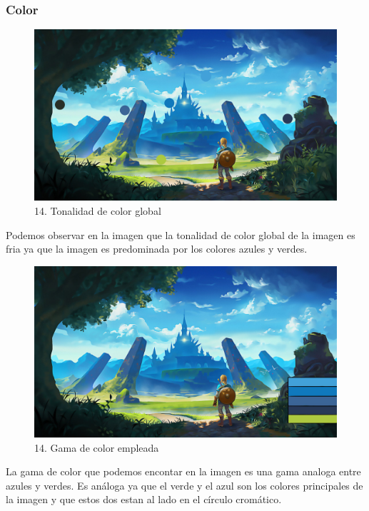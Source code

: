 \documentclass[12pt]{article}
\begin{document}
    \subsubsection{Color}
    \begin{figure}[H]
      \centering
      \includegraphics[width=\textwidth]{images/Selena/14_concept_art color.jpg}
      \caption{\small 14. Tonalidad de color global}
    \end{figure}
    Podemos observar en la imagen que la tonalidad de color global de la imagen es fria ya que la imagen es predominada por los colores azules y verdes.

    \begin{figure}[H]
      \centering
      \includegraphics[width=\textwidth]{images/Selena/14_concept_art tabla.jpg}
      \caption{\small 14. Gama de color empleada}
    \end{figure}
    La gama de color que podemos encontar en la imagen es una gama analoga entre azules y verdes. Es análoga ya que el verde y el azul son los colores principales de la imagen y que estos dos estan al lado en el círculo cromático. 
\end{document}
